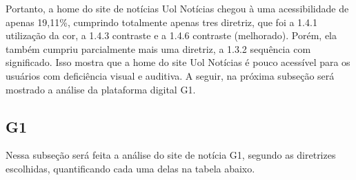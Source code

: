 \documentclass[a4paper]{article}
\begin{document}
\begin{titlepage}
Portanto, a home do site de notícias Uol Notícias chegou à uma acessibilidade de apenas 19,11\%, cumprindo totalmente apenas tres diretriz, que foi a 1.4.1 utilização da cor, a 1.4.3 contraste e a 1.4.6 contraste (melhorado). Porém, ela também cumpriu parcialmente mais uma diretriz, a 1.3.2 sequência com significado. Isso mostra que a home do site Uol Notícias é pouco acessível para os usuários com deficiência visual e auditiva. A seguir, na próxima subseção será mostrado a análise da plataforma digital G1.

\subsection{G1}

Nessa subseção será feita a análise do site de notícia G1, segundo as diretrizes escolhidas, quantificando cada uma delas na tabela abaixo.\\


\end{titlepage}
\end{document}
